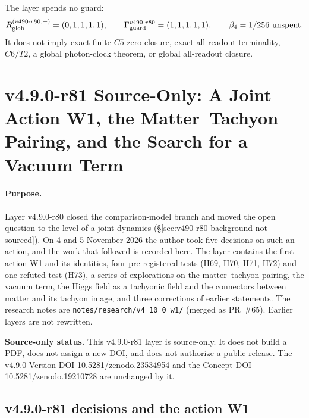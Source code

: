 The layer spends no guard:
\[
R_{\rm glob}^{(v490\text{-}r80,+)}=(0,1,1,1,1),
\qquad
\Gamma_{\rm guard}^{v490\text{-}r80}=(1,1,1,1,1),
\qquad
\beta_4=1/256\ \text{unspent}.
\]
It does not imply exact finite \(C5\) zero closure, exact all-readout terminality,
\(C6/T2\), a global photon-clock theorem, or global all-readout closure.

\clearpage
\section*{v4.9.0-r81 Source-Only: A Joint Action W1, the Matter--Tachyon Pairing, and the Search for a Vacuum Term}
\label{sec:v490-r81-joint-action-w1}

\paragraph{Purpose.}
Layer v4.9.0-r80 closed the comparison-model branch and moved the open question to the level of a joint dynamics
(\S\ref{sec:v490-r80-background-not-sourced}).  On 4 and 5 November 2026 the author took five decisions on such an action, and the
work that followed is recorded here.  The layer contains the first action W1 and its identities, four pre-registered tests (H69,
H70, H71, H72) and one refuted test (H73), a series of explorations on the matter--tachyon pairing, the vacuum term, the Higgs
field as a tachyonic field and the connectors between matter and its tachyon image, and three corrections of earlier statements.
The research notes are \texttt{notes/\allowbreak research/\allowbreak v4\_10\_0\_w1/} (merged as PR~\#65).  Earlier layers are
not rewritten.

\noindent\textbf{Source-only status.}
This v4.9.0-r81 layer is source-only.  It does not build a PDF, does not assign a new DOI,
and does not authorize a public release.  The v4.9.0 Version DOI
\href{https://doi.org/10.5281/zenodo.23534954}{10.5281/zenodo.23534954} and the Concept DOI
\href{https://doi.org/10.5281/zenodo.19210728}{10.5281/zenodo.19210728} are unchanged by it.

\subsection*{v4.9.0-r81 decisions and the action W1}
\label{subsec:v490-r81-action}

